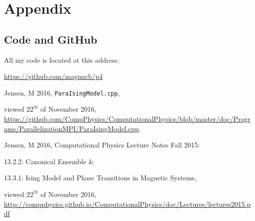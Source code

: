 \documentclass[11pt,a4paper,notitlepage,twocolumn]{article}
\begin{document}
\section{Appendix}
\subsection{Code and GitHub}
All my code is located at this address:

\url{https://github.com/magnucb/p4}

\begin{thebibliography}{9}
  Jensen, M 2016,
  \verb|ParaIsingModel.cpp|,
  
  viewed $22^{th}$ of November 2016,
  \url{https://github.com/CompPhysics/ComputationalPhysics/blob/master/doc/Programs/ParallelizationMPI/ParaIsingModel.cpp}.
  
	Jensen, M 2016, 
	Computational Physics Lecture Notes Fall 2015:
	
	13.2.2: Canonical Ensemble \& 
	
	13.3.1: Ising Model and Phase Transitions in Magnetic Systems,
	
	viewed $22^{th}$ of November 2016, 
	\url{http://compphysics.github.io/ComputationalPhysics/doc/Lectures/lectures2015.pdf}

\end{thebibliography}
\end{document}
